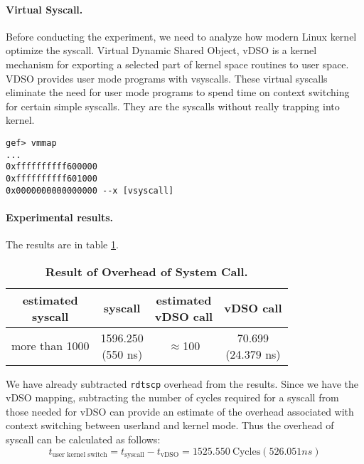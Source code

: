 \paragraph{Virtual Syscall.} Before conducting the experiment, we need to analyze how modern Linux kernel optimize the syscall. Virtual Dynamic Shared Object, vDSO is a kernel mechanism for exporting a selected part of kernel space routines to user space. VDSO provides user mode programs with vsyscalls. These virtual syscalls eliminate the need for user mode programs to spend time on context switching for certain simple syscalls. They are the syscalls without really trapping into kernel.

\begin{lstlisting}[caption=vDSO mapping]
gef> vmmap
...
0xffffffffff600000 
0xffffffffff601000 
0x0000000000000000 --x [vsyscall]
\end{lstlisting}

\paragraph{Experimental results.} The results are in table \ref{table:syscall-test}.
\begin{table}[h]
	\centering
	\begin{tabular}{c|c|c|c}
		\hline
		\makecell{estimated \\ syscall} & \bf{syscall} & \makecell{estimated \\ vDSO call} & \bf{vDSO call} \\ \hline
        more than 1000 & \makecell{1596.250 \\ (550 ns)} & $\approx$100 & \makecell{70.699 \\ (24.379 ns)} \\ \hline
	\end{tabular}
	\caption{\textbf{Result of Overhead of System Call.}}
	\label{table:syscall-test}
\end{table}
We have already subtracted \texttt{rdtscp} overhead from the results. Since we have the vDSO mapping, subtracting the number of cycles required for a syscall from those needed for vDSO can provide an estimate of the overhead associated with context switching between userland and kernel mode. Thus the overhead of syscall can be calculated as follows:
\begin{equation}
    t_{\text{user\ kernel\ switch}}=t_{\text{syscall}}-t_{\text{vDSO}}=1525.550\ \text{Cycles} (526.051 ns)
\end{equation}

